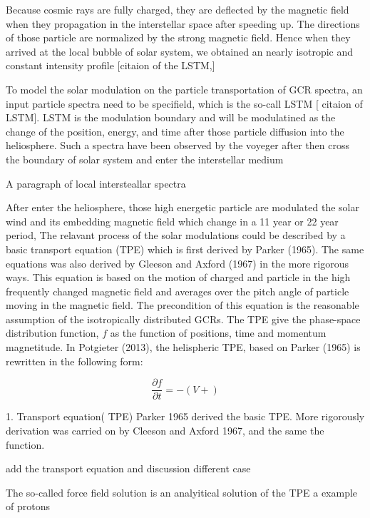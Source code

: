 Because cosmic rays are fully charged, they are deflected by the magnetic field when they propagation in the interstellar space after speeding up. The directions of those particle are normalized by the strong magnetic field. Hence when they arrived at the local bubble of solar system, we obtained an nearly isotropic and constant intensity profile [citaion of the LSTM,]


To model the solar modulation on the particle transportation of GCR spectra, an input particle spectra need to be specifield, which is the so-call LSTM [ citaion of LSTM]. LSTM is the modulation boundary and will be modulatined as the change of the position, energy, and time after those particle diffusion into the heliosphere. Such a spectra have been observed by the voyeger after then cross the boundary of solar system and enter the interstellar medium


	
A paragraph of local intersteallar spectra


After enter the heliosphere, those high energetic particle are modulated the solar wind and its embedding magnetic field  which change in a 11 year or 22 year period,
The relavant process of the solar modulations could be described by a basic transport equation (TPE) which is first derived by Parker (1965). The same equations was also derived by Gleeson and Axford (1967) in the more rigorous ways. This equation is based on the motion of charged and particle in the high frequently changed magnetic field and averages over the pitch angle of particle moving in the magnetic field. The precondition of this equation is the reasonable assumption of the isotropically distributed GCRs. The TPE give the phase-space distribution function, $f$ as the function of positions, time  and momentum magnetitude. In Potgieter (2013), the helispheric TPE, based on Parker (1965) is rewritten in the following form:

\begin{equation}
	\frac{\partial f}{\partial t} = - ( V + )

\end{equation}


1. Transport equation( TPE)
	 Parker 1965 derived the basic TPE. More rigorously derivation was carried on by Cleeson and Axford 1967, and the same the function.
	
	add the transport equation and discussion different case
	
    The so-called force field solution is an analyitical solution of the TPE a example of protons
    
